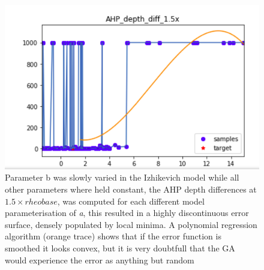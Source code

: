 \begin{figure}
      \centering
      \includegraphics[scale=0.85]{figures/parameter_b_hopeless_surface2.png}
      \caption[Cross section of difficult or hopeless error surface]{Parameter b was slowly varied in the Izhikevich model while all other parameters where held constant, the AHP depth differences at $1.5 \times rheobase$, was computed for each different model parameterisation of \emph{a}, this resulted in a highly  discontinuous error surface, densely populated by local minima. A polynomial regression algorithm (orange trace) shows that if the error function is smoothed it looks convex, but it is very doubtfull that the GA would experience the error as anything but random}
      \label{fig:discontinuous_constraint}
\end{figure}



